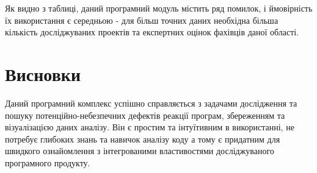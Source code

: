 Як видно з таблиці, даний програмний модуль містить ряд помилок, і ймовірність їх використання є середньою - для більш точних даних необхідна більша кількість досліджуваних проектів та експертних оцінок фахівців даної області.

\pagebreak

\section*{Висновки}
Даний програмний комплекс успішно справляється з задачами дослідження та  пошуку потенційно-небезпечних дефектів реакції програм, збереженням та візуалізацією даних аналізу. Він є простим та інтуїтивним в використанні, не потребує глибоких знань та навичок аналізу коду а тому є придатним для швидкого ознайомлення з інтегрованими властивостями досліджуваного програмного продукту. 
